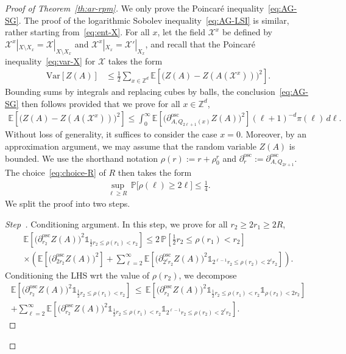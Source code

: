 \documentclass[10pt]{amsart}
\theoremstyle{definition}\newtheorem{defi}[theo]{Definition}\newtheorem{rema}[theo]{Remark}\newtheorem{exam}[theo]{Example}\newtheorem{exem}[theo]{Example}\newtheorem{nota}[theo]{Notation}
\newcommand{\Z}{\mathbb Z}
\newcommand{\expec}[1]{\mathbb{E}\left[#1 \right]}
\newcommand{\pr}[1]{\mathbb{P}\left[#1 \right]}
\newcommand{\prm}[1]{\mathbb{P}\big[#1 \big]}
\newcommand{\X}{\mathcal X}
\newcommand{\osc}{\partial^{\mathrm{osc}}}
\newcommand{\oscd}[1]{\mathrel{\osc_{#1}}}
\newcommand{\var}[1]{\mathrm{Var}\left[#1\right]}
\newcounter{stepcount}
\newenvironment{step}{\refstepcounter{stepcount}\begin{proof}[Step~\thestepcount]}{\let\qed\relax\end{proof}}
\begin{document}
\begin{proof}[Proof of Theorem~\ref{th:ar-rpm}]
We only prove the Poincaré inequality~\eqref{eq:AG-SG}. The proof of the logarithmic Sobolev inequality~\eqref{eq:AG-LSI} is similar, rather starting from~\eqref{eq:ent-X}. For all $x$, let the field $\X^x$ be defined by $\X^x|_{X\setminus X_{x}}=\X|_{X\setminus X_{x}}$ and $\X^x|_{X_{x}}=\X'|_{X_{x}}$, and recall that the Poincaré inequality~\eqref{eq:var-X} for $\X$ takes the form
\begin{align*}
\var{Z(A)}&\le\frac12\sum_{x\in\Z^d}\expec{\big(Z(A)-Z(A(\X^x))\big)^2}.
\end{align*}
Bounding sums by integrals and replacing cubes by balls, the conclusion~\eqref{eq:AG-SG} then follows provided that we prove for all $x\in\Z^d$,
\begin{align}\label{eq:AG-centered}
\expec{\big(Z(A)-Z(A(\X^x))\big)^2}\le\int_0^\infty \expec{\Big(\oscd{A,Q_{2\ell+1}(x)}Z(A)\Big)^2}(\ell+1)^{-d}\pi(\ell)\,d\ell.
\end{align}
Without loss of generality, it suffices to consider the case $x=0$. Moreover, by an approximation argument, we may assume that the random variable $Z(A)$ is bounded. We use the shorthand notation $\rho(r):=r+\rho_0^r$ and $\oscd{r}:=\oscd{A,Q_{2r+1}}$. The choice~\eqref{eq:choice-R} of $R$ then takes the form
\begin{align}\label{eq:choice-R2}
\sup_{\ell\ge R}\,\prm{\rho(\ell)\ge2\ell}\le\tfrac14.
\end{align}
We split the proof into two steps.

\medskip

\setcounter{stepcount}{0}
\begin{step}{Conditioning argument.}\label{step1prooftheo2.8}
In this step, we prove for all $r_2\ge 2r_1\ge2R$,
\begin{multline}\label{eq:AG-intermed}
\expec{\Big(\oscd{r_2}Z(A)\Big)^2\mathds1_{\frac12r_2\le\rho(r_1)<r_2}}\le2\,\pr{\tfrac12 r_2\le\rho(r_1)<r_2}\\
\times\left(\expec{\Big(\oscd{2r_2}Z(A)\Big)^2}+\sum_{\ell=2}^\infty\expec{\Big(\oscd{2^\ell r_2}Z(A)\Big)^2\mathds1_{2^{\ell-1}r_2\le \rho(r_2)<2^{\ell}r_2}}\right).
\end{multline}
Conditioning the LHS wrt the value of $\rho(r_2)$, we decompose
\begin{multline}\label{eq:decomp-AG-2}
\expec{\Big(\oscd{r_2}Z(A)\Big)^2\mathds1_{\frac12r_2\le\rho(r_1)<r_2}}\,\le\,\expec{\Big(\oscd{r_2}Z(A)\Big)^2\mathds1_{\frac12r_2\le\rho(r_1)<r_2}\mathds1_{\rho(r_2)<2r_2}}\\
+\sum_{\ell=2}^\infty\expec{\Big(\oscd{r_2}Z(A)\Big)^2\mathds1_{\frac12r_2\le\rho(r_1)<r_2}\mathds1_{2^{\ell-1}r_2\le\rho(r_2)<2^{\ell}r_2}}.
\end{multline}
\pagebreak


\end{step}
\end{proof}
\end{document}
